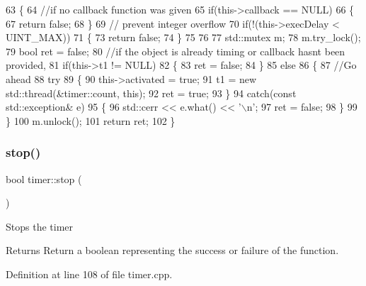 \begin{DoxyCode}
63 \{
64     \textcolor{comment}{//if no callback function was given}
65     \textcolor{keywordflow}{if}(this->callback == NULL)
66     \{
67         \textcolor{keywordflow}{return} \textcolor{keyword}{false};
68     \}
69     \textcolor{comment}{// prevent integer overflow}
70     \textcolor{keywordflow}{if}(!(this->execDelay < UINT\_MAX))    
71     \{
73         \textcolor{keywordflow}{return} \textcolor{keyword}{false};
74     \}
75     
76 
77     std::mutex m;
78     m.try\_lock();
79     \textcolor{keywordtype}{bool} ret = \textcolor{keyword}{false};
80     \textcolor{comment}{//if the object is already timing or callback hasnt been provided,}
81     \textcolor{keywordflow}{if}(this->t1 != NULL)
82     \{
83         ret = \textcolor{keyword}{false};
84     \}
85     \textcolor{keywordflow}{else}
86     \{
87         \textcolor{comment}{//Go ahead}
88         \textcolor{keywordflow}{try}
89         \{
90             this->activated = \textcolor{keyword}{true};
91             t1 = \textcolor{keyword}{new} std::thread(&timer::count, \textcolor{keyword}{this});
92             ret = \textcolor{keyword}{true};
93         \}
94         \textcolor{keywordflow}{catch}(\textcolor{keyword}{const} std::exception& e)
95         \{
96             std::cerr << e.what() << \textcolor{charliteral}{'\(\backslash\)n'};
97             ret = \textcolor{keyword}{false};
98         \}
99     \}
100     m.unlock();
101     \textcolor{keywordflow}{return} ret;
102 \}
\end{DoxyCode}
\mbox{\label{classtimer_ad21a0c9113d870f8485b775f1fcd3c73}} 
\subsubsection{\texorpdfstring{stop()}{stop()}}
{\footnotesize\ttfamily bool timer\+::stop (\begin{DoxyParamCaption}{ }\end{DoxyParamCaption})}

Stops the timer \begin{DoxyReturn}{Returns}
Return a boolean representing the success or failure of the function. 
\end{DoxyReturn}


Definition at line 108 of file timer.\+cpp.


